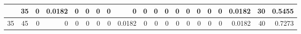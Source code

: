 \begin{table}[ht]
\begin{adjustbox}{width = \textwidth, center}
\begin{tabular}{|cc|r|r|r|r|r|r|r|r|r|r|r|r|r|r|r|rrr|}
        \cellcolor[HTML]{C9DAF8}\enskip 25 \enskip             & \cellcolor[HTML]{EBF1FC}35             & 0                                              & \cellcolor[HTML]{DEF2E8}0.0182                 & 0                                              & 0                                              & 0                                              & 0                                              & 0                                              & 0                                               & 0                                               & 0                                               & 0                                               & 0                                               & 0                                               & 0                                               & 0                                               & \multicolumn{1}{r|}{\cellcolor[HTML]{D9D2E9}0.0182}                             & \multicolumn{1}{r|}{\cellcolor[HTML]{D9D2E9}30}                         & \cellcolor[HTML]{D9D2E9}0.5455                                                                   \\ \hline
        \rowcolor[HTML]{FFFFFF} 
        \cellcolor[HTML]{C9DAF8}35             & \cellcolor[HTML]{EBF1FC}45             & 0                                              & 0                                              & 0                                              & 0                                              & 0                                              & 0                                              & \cellcolor[HTML]{DEF2E8}0.0182                 & 0                                               & 0                                               & 0                                               & 0                                               & 0                                               & 0                                               & 0                                               & 0                                               & \multicolumn{1}{r|}{\cellcolor[HTML]{D9D2E9}0.0182}                             & \multicolumn{1}{r|}{\cellcolor[HTML]{D9D2E9}40}                         & \cellcolor[HTML]{D9D2E9}0.7273                                                                   \\ \hline

\end{tabular}
\end{adjustbox}
\end{table}
